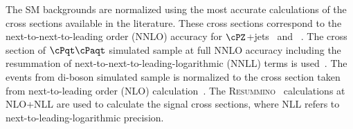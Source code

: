 The SM backgrounds are normalized using the most accurate calculations of the cross sections available 
in the literature. These cross sections correspond to the next-to-next-to-leading order (NNLO) accuracy for $\cPZ$+jets~\cite{Melnikov:2006kv} 
and \wjets~\cite{xsec_WZ}.%
 The cross section of $\cPqt\cPaqt$ simulated sample at full NNLO accuracy including the resummation of 
next-to-next-to-leading-logarithmic (NNLL) terms is used~\cite{Czakon:2011xx}. The events from di-boson simulated sample is normalized to the 
cross section taken from next-to-leading order (NLO) calculation~\cite{Campbell:2011bn}.
The \textsc{Resummino}~\cite{Fuks:2012qx,Fuks:2013vua,Fuks:2013lya} calculations at NLO+NLL are used to calculate the signal cross sections, where 
NLL refers to next-to-leading-logarithmic precision.




